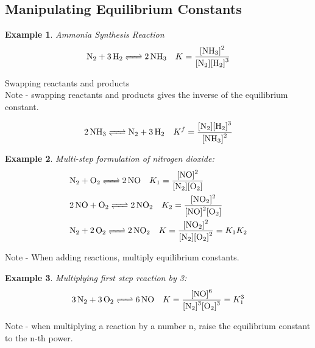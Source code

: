 \documentclass{article}  %
\newtheorem{exmp}{Example}
\begin{document}
\subsection*{Manipulating Equilibrium Constants}
\begin{exmp}
    Ammonia Synthesis Reaction 
    \begin{equation*}
        \begin{aligned}
            \ce{N2 + 3 H2 <=> 2 NH3} \quad K = \ce{\frac{[NH3]^2}{[N2][H2]^3}}
        \end{aligned}
    \end{equation*}
\end{exmp}
Swapping reactants and products \\
Note - swapping reactants and products gives the inverse of the equilibrium constant.

\begin{equation*}
    \begin{aligned}
        \ce{2 NH3 <=> N2 + 3 H2} \quad K^f = \ce{\frac{[N2][H2]^3}{[NH3]^2}}
    \end{aligned}
\end{equation*}

\begin{exmp}
    Multi-step formulation of nitrogen dioxide: 
    \begin{equation*}
        \begin{aligned}
            &\ce{N2 + O2 <=> 2 NO} \quad K_1 = \ce{\frac{[NO]^2}{[N2][O2]}} \\
            &\ce{2 NO + O2 <=> 2 NO2} \quad K_2 = \ce{\frac{[NO2]^2}{[NO]^2[O2]}} \\
            &\ce{N2 + 2 O2 <=> 2 NO2} \quad K = \ce{\frac{[NO2]^2}{[N2][O2]^2}} = K_1K_2
        \end{aligned}
    \end{equation*}
\end{exmp}
Note - When adding reactions, multiply equilibrium constants.

\begin{exmp}
    Multiplying first step reaction by 3: 
    \begin{equation*}
        \begin{aligned}
            &\ce{3N2 + 3O2 <=> 6 NO} \quad K = \ce{\frac{[NO]^6}{[N2]^3[O2]^3}} = K_1^3 \\
        \end{aligned}
    \end{equation*}
\end{exmp}
Note - when multiplying a reaction by a number n, raise the equilibrium constant to the n-th power.
\end{document}
